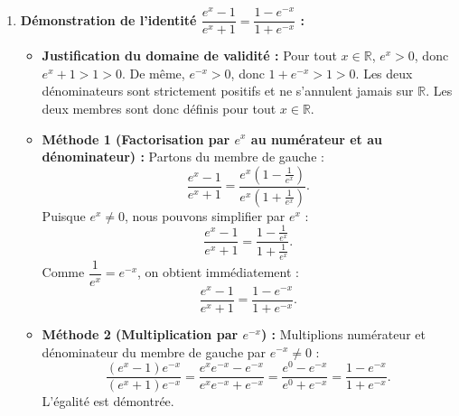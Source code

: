 \documentclass[11pt,a4paper]{article}
\newcommand{\R}{\mathbb{R}}
\begin{document}
\begin{correctionbox}[Exercice 2]
\begin{enumerate}[label=\textbf{\arabic*.}]
    \item \textbf{Démonstration de l'identité $\dfrac{e^x - 1}{e^x + 1} = \dfrac{1 - e^{-x}}{1 + e^{-x}}$ :}
    \begin{itemize}
        \item \textbf{Justification du domaine de validité :}
        Pour tout $x \in \R$, $e^x > 0$, donc $e^x + 1 > 1 > 0$. De même, $e^{-x} > 0$, donc $1 + e^{-x} > 1 > 0$. Les deux dénominateurs sont strictement positifs et ne s'annulent jamais sur $\R$. Les deux membres sont donc définis pour tout $x \in \R$.
        \item \textbf{Méthode 1 (Factorisation par $e^x$ au numérateur et au dénominateur) :}
        Partons du membre de gauche :
        \[
        \frac{e^x - 1}{e^x + 1} = \frac{e^x\left(1 - \frac{1}{e^x}\right)}{e^x\left(1 + \frac{1}{e^x}\right)}.
        \]
        Puisque $e^x \neq 0$, nous pouvons simplifier par $e^x$ :
        \[
        \frac{e^x - 1}{e^x + 1} = \frac{1 - \frac{1}{e^x}}{1 + \frac{1}{e^x}}.
        \]
        Comme $\dfrac{1}{e^x} = e^{-x}$, on obtient immédiatement :
        \[
        \frac{e^x - 1}{e^x + 1} = \frac{1 - e^{-x}}{1 + e^{-x}}.
        \]
        \item \textbf{Méthode 2 (Multiplication par $e^{-x}$) :}
        Multiplions numérateur et dénominateur du membre de gauche par $e^{-x} \neq 0$ :
        \[
        \frac{(e^x - 1)e^{-x}}{(e^x + 1)e^{-x}} = \frac{e^x e^{-x} - e^{-x}}{e^x e^{-x} + e^{-x}} = \frac{e^0 - e^{-x}}{e^0 + e^{-x}} = \frac{1 - e^{-x}}{1 + e^{-x}}.
        \]
        L'égalité est démontrée.
    \end{itemize}


\end{enumerate}
\end{correctionbox}
\end{document}
